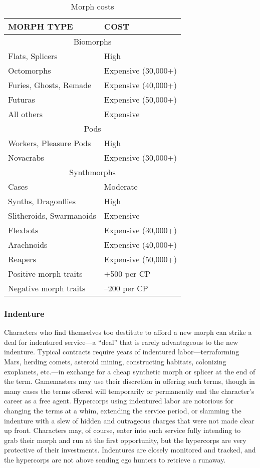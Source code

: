 \begin{table}
\caption{Morph costs}
\begin{tabular}{|l|l|}
\hline
MORPH TYPE & COST \\
\hline
\multicolumn{2}{|c|}{Biomorphs} \\
\hline
Flats, Splicers & High \\
\hline
Octomorphs & Expensive (30,000+) \\
\hline
Furies, Ghosts, Remade & Expensive (40,000+) \\
\hline
Futuras & Expensive (50,000+) \\
\hline
All others & Expensive \\
\hline
\multicolumn{2}{|c|}{Pods} \\
\hline
Workers, Pleasure Pods & High \\
\hline
Novacrabs & Expensive (30,000+) \\
\hline
\multicolumn{2}{|c|}{Synthmorphs} \\
\hline
Cases & Moderate \\
\hline
Synths, Dragonflies & High \\
\hline
Slitheroids, Swarmanoids & Expensive \\
\hline
Flexbots & Expensive (30,000+) \\
\hline
Arachnoids & Expensive (40,000+) \\
\hline
Reapers & Expensive (50,000+) \\
\hline
Positive morph traits & +500 per CP \\
\hline
Negative morph traits & –200 per CP \\
\hline
\end{tabular}
\label{table:morph-costs}
\end{table}


\subsubsection{Indenture}

Characters who find themselves too destitute to 
afford a new morph can strike a deal for indentured 
service—a ``deal'' that is rarely advantageous to the 
new indenture. Typical contracts require years of indentured
labor—terraforming Mars, herding comets,
asteroid mining, constructing habitats, colonizing 
exoplanets, etc.—in exchange for a cheap synthetic 
morph or splicer at the end of the term. Gamemasters 
may use their discretion in offering such terms, though 
in many cases the terms offered will temporarily or 
permanently end the character's career as a free agent. 
Hypercorps using indentured labor are notorious for 
changing the terms at a whim, extending the service 
period, or slamming the indenture with a slew of 
hidden and outrageous charges that were not made 
clear up front. Characters may, of course, enter into 
such service fully intending to grab their morph and 
run at the first opportunity, but the hypercorps are 
very protective of their investments. Indentures are 
closely monitored and tracked, and the hypercorps are 
not above sending ego hunters to retrieve a runaway.


